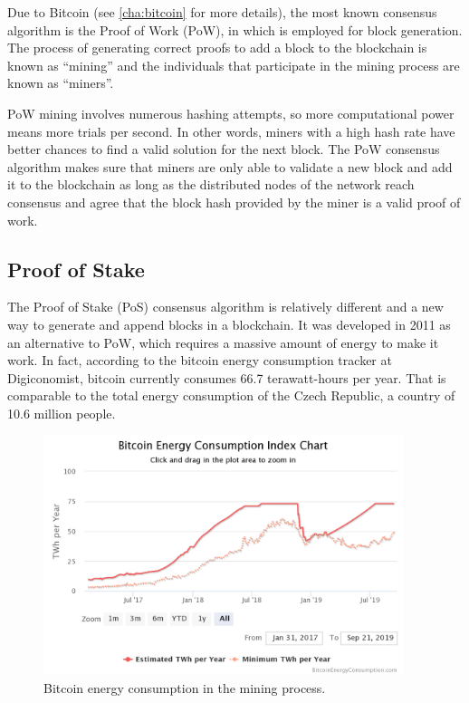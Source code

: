 Due to Bitcoin (see \ref{cha:bitcoin} for more details), the most known consensus algorithm is the Proof of 
Work (PoW), in which is employed for block generation. 
The process of generating correct proofs to add a block 
to the blockchain is known as “mining” and the individuals that 
participate in the mining process are known as “miners”.\cite{consensusmedium}

PoW mining involves numerous hashing attempts, so more computational 
power means more trials per second. In other words, miners with a high 
hash rate have better chances to find a valid solution for the next 
block. The PoW consensus algorithm makes sure that miners are only able 
to validate a new block and add it to the blockchain as long as 
the distributed nodes of the network reach consensus and agree that the 
block hash provided by the miner is a valid proof of work.\cite{binancevision}

\subsection{Proof of Stake}
\label{sec:pos}

The Proof of Stake (PoS) consensus algorithm 
is relatively different and a new way to generate and append blocks in a 
blockchain. It was developed in 2011 as an alternative to PoW, which requires
a massive amount of energy to make it work. In fact, according to the 
bitcoin energy consumption tracker at Digiconomist\cite{digiconomist}, 
bitcoin currently consumes 66.7 terawatt-hours per year. That is comparable 
to the total energy consumption of the Czech Republic, a country 
of 10.6 million people.

\begin{figure}[h]
    \centering
    \includegraphics[height=7cm]{energy.png}
    \caption{Bitcoin energy consumption in the mining process.\cite{digiconomist}}
    \label{fig:energy}
\end{figure}

